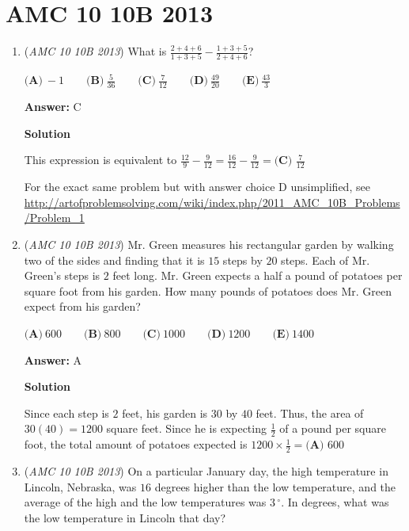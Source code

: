 \section{AMC 10 10B 2013}
        \begin{enumerate}
        	\item (\textit{AMC 10 10B 2013}) What is $\frac{2+4+6}{1+3+5} - \frac{1+3+5}{2+4+6}$?


 $\textbf{(A)}\ -1 \qquad\textbf{(B)}\ \frac{5}{36}  \qquad\textbf{(C)}\ \frac{7}{12} \qquad\textbf{(D)}\ \frac{49}{20} \qquad\textbf{(E)}\ \frac{43}{3}$

 \textbf{Answer: }C



\textbf{Solution}

This expression is equivalent to $\frac{12}{9} - \frac{9}{12} = \frac{16}{12} - \frac{9}{12} = \boxed{\textbf{(C) }\frac{7}{12}}$

 For the exact same problem but with answer choice D unsimplified, see \href{https://artofproblemsolving.comhttp://artofproblemsolving.com/wiki/index.php/2011\_AMC\_10B\_Problems/Problem\_1}{http://artofproblemsolving.com/wiki/index.php/2011\_AMC\_10B\_Problems/Problem\_1}

 


	\item (\textit{AMC 10 10B 2013}) Mr. Green  measures his rectangular garden by walking two of the sides and finding that it is $15$ steps by $20$ steps.  Each of Mr. Green's steps is $2$ feet long.  Mr. Green expects a half a pound of potatoes per square foot from his garden.  How many pounds of potatoes does Mr. Green expect from his garden?


 $\textbf{(A)}\ 600 \qquad\textbf{(B)}\ 800  \qquad\textbf{(C)}\ 1000 \qquad\textbf{(D)}\ 1200 \qquad\textbf{(E)}\ 1400$

 \textbf{Answer: }A



\textbf{Solution}

Since each step is $2$ feet, his garden is $30$ by $40$ feet.  Thus, the area of $30(40) = 1200$ square feet.  Since he is expecting $\frac{1}{2}$ of a pound per square foot, the total amount of potatoes expected is $1200 \times \frac{1}{2} =  \boxed{\textbf{(A) }600}$



	\item (\textit{AMC 10 10B 2013}) On a particular January day, the high temperature in Lincoln, Nebraska, was $16$ degrees higher than the low temperature, and the average of the high and the low temperatures was $3\,^\circ$. In degrees, what was the low temperature in Lincoln that day?



\end{enumerate}
